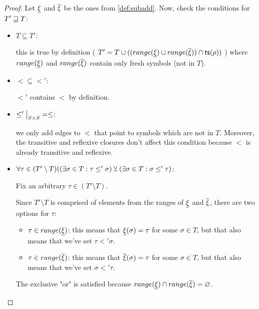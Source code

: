 \documentclass[main.tex]{subfiles}
\begin{document}
\begin{proof}
    Let $\underline{\xi}$ and $\overline{\xi}$ be the ones from \cref{def:subadd}.
    Now, check the conditions for $T' \sqsupseteq T$:
    \begin{itemize}
        \item $T \subseteq T'$:

            this is true by definition (
            $T' = T \cup ((range(\underline{\xi}) \cup range(\overline{\xi})) \cap \mathsf{ts}(\rho))$
            ) where $range(\underline{\xi})$ and $range(\overline{\xi})$ contain
            only fresh symbols (not in $T$).

        \item $\less \subseteq \less'$:

            $\less'$ contains $\less$ by definition.

        \item $\restr{\less'}{S \times S} = \less$:

            we only add edges to $\less$ that point to symbols which are not
            in $T$. Moreover, the transitive and reflexive closures don't
            affect this condition because $\less$ is already transitive and
            reflexive.

        \item $\forall \tau \in (T' \setminus T) ((\exists \sigma \in T : \tau \leq' \sigma )
            \veebar (\exists \sigma \in T : \sigma \leq' \tau)$:

            Fix an arbitrary $\tau \in (T' \setminus T)$.

            Since $T' \setminus T$ is comprised of elements from the ranges
            of $\underline{\xi}$ and $\overline{\xi}$, there are two options
            for $\tau$:
            \begin{itemize}
                \item $\tau \in range(\underline{\xi})$: this means that
                    $\underline{\xi}(\sigma) = \tau$ for some $\sigma \in T$, but that
                    also means that we've set $\tau \less' \sigma$.
                \item $\tau \in range(\overline{\xi})$: this means that
                    $\overline{\xi}(\sigma) = \tau$ for some $\sigma \in T$, but that
                    also means that we've set $\sigma \less' \tau$.
            \end{itemize}

            The exclusive "or" is satisfied because
            $range(\underline{\xi}) \cap range(\overline{\xi}) = \varnothing$.
    \end{itemize}
\end{proof}
\end{document}
